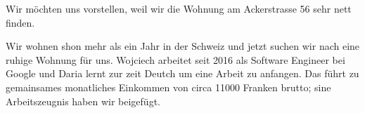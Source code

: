 \documentclass[11pt, a4paper]{awesome-cv} %
\begin{document}
\makecvheader %

\makelettertitle %


\begin{cvletter}


Wir möchten uns vorstellen, weil wir die Wohnung am Ackerstrasse 56 sehr nett finden.

Wir wohnen shon mehr als ein Jahr in der Schweiz und jetzt suchen wir nach eine ruhige Wohnung für uns.
Wojciech arbeitet seit 2016 als Software Engineer bei Google und Daria lernt zur zeit Deutch um eine Arbeit zu anfangen.
Das führt zu gemainsames monatliches Einkommen von circa 11000 Franken brutto; sine Arbeitszeugnis haben wir beigefügt.









\end{cvletter}



\makeletterclosing %




\end{document}
